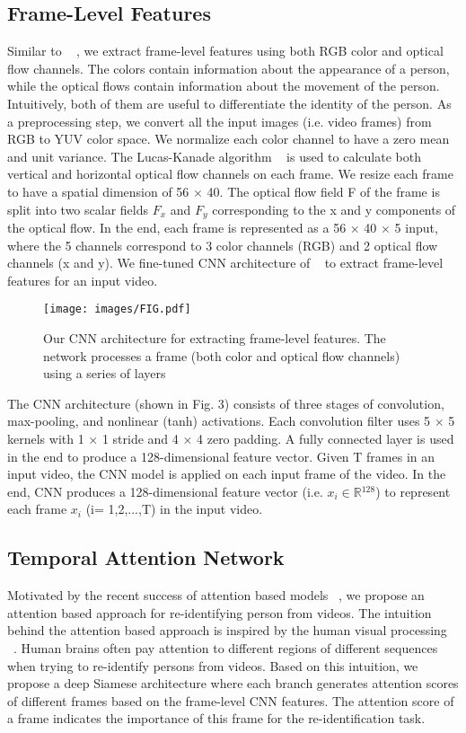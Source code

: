 \documentclass[sigconf, authordraft,review=false]{acmart}
\begin{document}
\subsection{ Frame-Level Features}
Similar  to  ~\cite{mclaughlin16_cvpr} ,  we  extract  frame-level  features  using
both RGB color and optical flow channels. The colors contain information about the appearance of a person, while the
optical  flows  contain  information  about  the  movement  of
the person.  Intuitively, both of them are useful to differentiate the identity of the person. As a preprocessing step, we
convert all the input images (i.e.  video frames) from RGB
to YUV color space.  We normalize each color channel to
have a zero mean and unit variance. The Lucas-Kanade algorithm ~\cite{lucas1981_iterative} is used to calculate both vertical and horizontal
optical flow channels on each frame. We resize each frame
to have a spatial dimension of 56 $\times$ 40.  The optical flow
field F of the frame is split into two scalar fields $F_x$ and $F_y$
corresponding to the x and y components of the optical flow. In the end, each frame is represented as a 56  $\times$ 40  $\times$ 5 input, where the 5 channels correspond to 3 color channels (RGB) and 2 optical flow channels (x and y).  We fine-tuned CNN architecture of ~\cite{mclaughlin16_cvpr} to extract frame-level features for an input video. 
\begin{figure}[h]
\texttt{[image: images/FIG.pdf]}
\caption{Our CNN architecture for extracting frame-level features.  The  network  processes  a  frame  (both  color  and  optical  flow channels)  using  a  series  of  layers }
\end{figure}
The CNN architecture (shown in Fig. 3) consists of three stages of convolution, max-pooling, and nonlinear (tanh) activations. Each convolution filter uses 5  $\times$ 5 kernels with 1  $\times$ 1
stride and 4  $\times$ 4 zero padding. A fully connected layer is used in the end to produce a 128-dimensional feature vector.   Given
T frames in an input video,  the CNN model is  applied  on  each  input  frame  of  the video.  In the end, CNN produces a 128-dimensional feature  vector   (i.e. $x_i$\(\in\)\(\mathbb{R}\)$^{\text{128}}$) to represent each frame $x_i$
(i= 1,2,...,T) in the input video.

\subsection{Temporal Attention Network}
Motivated by the recent success of attention based models ~\cite{bahdanau15_iclr,santos16_arxiv,xu15_icml,yin16_tacl}, we propose an attention based approach
for re-identifying person from videos. The intuition behind
the attention based approach is inspired by the human visual
processing ~\cite{xu17_iccv}. Human brains often pay attention to different regions of different sequences when trying to re-identify
persons from videos. Based on this intuition, we propose a
deep Siamese architecture where each branch generates attention scores of different frames based on the frame-level
CNN features.  The attention score of a frame indicates the
importance of this frame for the re-identification task. 
\end{document}
